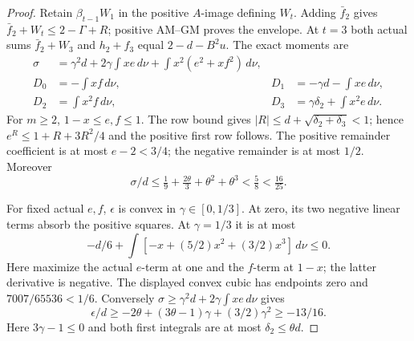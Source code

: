 \begin{proof}
Retain \(\beta_{t-1}W_1\) in the positive \(A\)-image defining
\(W_t\). Adding \(\bar f_2\) gives
\(\bar f_2+W_t\le2-\Gamma+R\); positive AM--GM proves the
envelope. At \(t=3\) both actual sums
\(\bar f_2+W_3\) and \(h_2+f_3\) equal \(2-d-B^2u\).
The exact moments are
\begin{equation}\label{eq:odd-two:packet-moments}
\begin{aligned}
 \sigma&=\gamma^2d+2\gamma\int x e\,d\nu
                +\int x^2(e^2+xf^2)\,d\nu,\\
 D_0&=-\int xf\,d\nu,&
 D_1&=-\gamma d-\int xe\,d\nu,\\
 D_2&=\int x^2f\,d\nu,&
 D_3&=\gamma\delta_2+\int x^2e\,d\nu.
\end{aligned}
\end{equation}
For \(m\ge2\), \(1-x\le e,f\le1\). The row bound gives
\(|R|\le d+\sqrt{\delta_2+\delta_3}<1\); hence
\(e^R\le1+R+3R^2/4\) and the positive first row follows.
The positive remainder coefficient is at most \(e-2<3/4\);
the negative remainder is at most \(1/2\).
Moreover
\[
 \sigma/d\le\tfrac19+\tfrac{2\theta}{3}+\theta^2+\theta^3
 <\tfrac58<\tfrac{16}{25}.
\]

For fixed actual \(e,f\), \(\epsilon\) is convex in
\(\gamma\in[0,1/3]\). At zero, its two negative linear terms
absorb the positive squares. At \(\gamma=1/3\) it is at most
\[
 -d/6+\int[-x+(5/2)x^2+(3/2)x^3]\,d\nu\le0.
\]
Here maximize the actual \(e\)-term at one and the \(f\)-term
at \(1-x\); the latter derivative is negative. The displayed
convex cubic has endpoints zero and \(7007/65536<1/6\).
Conversely \(\sigma\ge\gamma^2d+2\gamma\int xe\,d\nu\)
gives
\[
 \epsilon/d\ge-2\theta+(3\theta-1)\gamma+(3/2)\gamma^2
 \ge-13/16.
\]
Here \(3\gamma-1\le0\) and both first integrals are at most
\(\delta_2\le\theta d\).


\end{proof}
